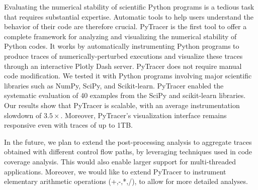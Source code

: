 \documentclass[10pt,journal,compsoc]{IEEEtran}
\newcommand{\pytracer}[0]{PyTracer\xspace}
\begin{document}
Evaluating the numerical stability of scientific Python programs is a tedious
task that requires substantial expertise. Automatic tools to help users
understand the behavior of their code are therefore crucial. \pytracer is the
first tool to offer a complete framework for analyzing and visualizing the
numerical stability of Python codes. It works by automatically instrumenting
Python programs to produce traces of numerically-perturbed executions and
visualize these traces through an interactive Plotly Dash server. \pytracer does
not require manual code modification. We tested it with Python programs
involving major scientific libraries such as NumPy, SciPy, and Scikit-learn.
\pytracer enabled the systematic evaluation of 40 examples from the SciPy and
scikit-learn libraries. Our results show that \pytracer is scalable, with an
average instrumentation slowdown of $3.5\times$. Moreover, \pytracer's
visualization interface remains responsive even with traces of up to 1TB.  

In the future, we plan to extend the post-processing analysis to aggregate
traces obtained with different control flow paths, by leveraging
techniques used in code coverage analysis. This would also enable larger
support for multi-threaded applications. Moreover, we would like to extend
\pytracer to instrument elementary arithmetic operations (+,-,*,/), to
allow for more detailed analyses. 







\ifCLASSOPTIONcaptionsoff
    \newpage
\fi





\end{document}
